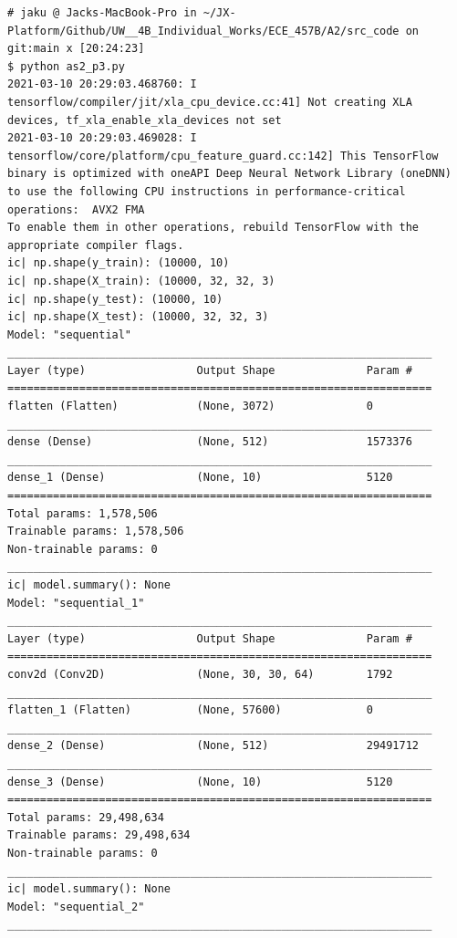 \documentclass{tron}
\begin{document}
\begin{lstlisting}[style=mystyle:output, label=output:p3]
# jaku @ Jacks-MacBook-Pro in ~/JX-Platform/Github/UW__4B_Individual_Works/ECE_457B/A2/src_code on git:main x [20:24:23]
$ python as2_p3.py
2021-03-10 20:29:03.468760: I tensorflow/compiler/jit/xla_cpu_device.cc:41] Not creating XLA devices, tf_xla_enable_xla_devices not set
2021-03-10 20:29:03.469028: I tensorflow/core/platform/cpu_feature_guard.cc:142] This TensorFlow binary is optimized with oneAPI Deep Neural Network Library (oneDNN) to use the following CPU instructions in performance-critical operations:  AVX2 FMA
To enable them in other operations, rebuild TensorFlow with the appropriate compiler flags.
ic| np.shape(y_train): (10000, 10)
ic| np.shape(X_train): (10000, 32, 32, 3)
ic| np.shape(y_test): (10000, 10)
ic| np.shape(X_test): (10000, 32, 32, 3)
Model: "sequential"
_________________________________________________________________
Layer (type)                 Output Shape              Param #
=================================================================
flatten (Flatten)            (None, 3072)              0
_________________________________________________________________
dense (Dense)                (None, 512)               1573376
_________________________________________________________________
dense_1 (Dense)              (None, 10)                5120
=================================================================
Total params: 1,578,506
Trainable params: 1,578,506
Non-trainable params: 0
_________________________________________________________________
ic| model.summary(): None
Model: "sequential_1"
_________________________________________________________________
Layer (type)                 Output Shape              Param #
=================================================================
conv2d (Conv2D)              (None, 30, 30, 64)        1792
_________________________________________________________________
flatten_1 (Flatten)          (None, 57600)             0
_________________________________________________________________
dense_2 (Dense)              (None, 512)               29491712
_________________________________________________________________
dense_3 (Dense)              (None, 10)                5120
=================================================================
Total params: 29,498,634
Trainable params: 29,498,634
Non-trainable params: 0
_________________________________________________________________
ic| model.summary(): None
Model: "sequential_2"
_________________________________________________________________

\end{lstlisting}
\end{document}
